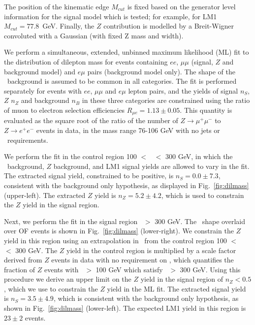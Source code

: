 The position of the kinematic edge $M_{cut}$ is fixed based on the generator level
information for the signal model which is tested; for example, for LM1 
$M_{cut} = 77.8$~GeV. Finally, the $Z$ contribution is modelled by a Breit-Wigner 
convoluted with a Gaussian (with fixed Z mass and width). 

We perform a simultaneous, extended, unbinned maximum 
likelihood (ML) fit to the distribution of dilepton mass for events containing $ee$, $\mu\mu$ 
(signal, $Z$ and background model)
and $e\mu$ pairs (background model only). 
The shape of the \ttbar\ background is assumed to be common in all categories.
The fit is performed separately for events with $ee$, $\mu\mu$ and $e\mu$ lepton pairs,
and the yields of signal $n_S$, $Z$ $n_Z$ and background $n_B$ 
in these three categories are constrained using the ratio of muon to electron selection efficiencies
$R_{\mu e} = 1.13 \pm 0.05$. This quantity is evaluated as the square root of the ratio of the number of 
$Z \to \mu^+\mu^-$ to $Z \to e^+e^-$ events in data, in the mass range 76-106 GeV with no jets or 
\met\ requirements. 

We perform the fit in the control region 100 $<$ \Ht\ $<$ 300 GeV, in
which the \ttbar\ background, $Z$ background, and LM1 signal yields are allowed to vary in the fit. 
The extracted signal yield, constrained to be positive, is $n_S = 0.0 \pm 7.3$, 
consistent with the background only 
hypothesis, as displayed in Fig.~\ref{fig:dilmass} (upper-left). 
The extracted $Z$ yield is $n_Z = 5.2 \pm 4.2$, which is 
used to constrain the $Z$ yield in the signal region. 

Next, we perform the fit in the signal region \Ht\ $>$ 300 GeV. The \ttbar\ shape
overlaid over OF events is shown in Fig.~\ref{fig:dilmass} (lower-right). We
constrain the $Z$ yield in this region using an extrapolation in \Ht\ from the 
control region 100 $<$ \Ht\ $<$ 300 GeV. The $Z$ yield in the control region is
multiplied by a scale factor derived from $Z$ events in data with no requirement
on \MET, which quantifies the fraction of $Z$ events with \Ht\ $>$ 100 GeV which 
satisfy \Ht\ $>$ 300 GeV. Using this procedure we derive an upper limit on the
$Z$ yield in the signal region of $n_Z < 0.5$, which we use to constrain the
$Z$ yield in the ML fit. The extracted signal yield is $n_S = 3.5 \pm 4.9$,
which is consistent with the background only hypothesis,
as shown in Fig.~\ref{fig:dilmass} (lower-left). The expected LM1
yield in this region is $23\pm2 $ events.
